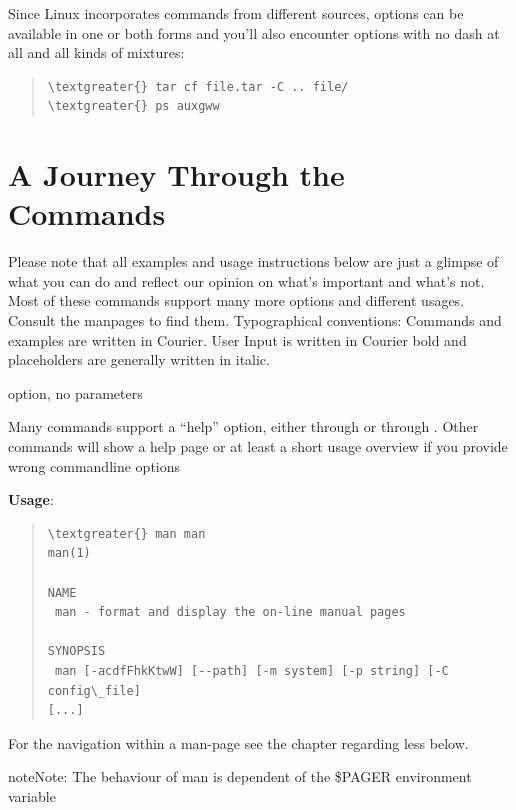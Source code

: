 \documentclass[letterpaper,10pt,english]{sphinxmanual}
\begin{document}
Since Linux incorporates commands from different sources, options can be available in one or both forms and you’ll also encounter options with no dash at all and all kinds of mixtures:
\begin{quote}

\begin{Verbatim}[commandchars=\\\{\}]
\textgreater{} tar cf file.tar -C .. file/
\textgreater{} ps auxgww
\end{Verbatim}
\end{quote}


\chapter{A Journey Through the Commands}
\label{IntroToCommandLine:a-journey-through-the-commands}
Please note that all examples and usage instructions below are just a glimpse of what you can do and reflect our opinion on what’s important and what’s not. Most of these commands support many more options and different usages. Consult the manpages to find them.
Typographical conventions: Commands and examples are written in Courier.  User Input is written in Courier bold and placeholders are generally written in italic.

 option, no parameters

Many commands support a “help” option, either through  or through .
Other commands will show a help page or at least a short usage overview if you provide wrong commandline options

\textbf{Usage}:
\begin{quote}

\begin{Verbatim}[commandchars=\\\{\}]
\textgreater{} man man
man(1)

NAME
 man - format and display the on-line manual pages

SYNOPSIS
 man [-acdfFhkKtwW] [--path] [-m system] [-p string] [-C config\_file]
[...]
\end{Verbatim}
\end{quote}

For the navigation within a man-page see the chapter regarding less below.

\begin{notice}{note}{Note:}
The behaviour of man is dependent of the \$PAGER environment variable
\end{notice}
\end{document}
